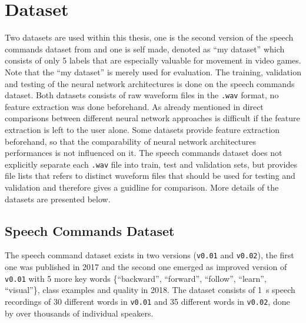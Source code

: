 
\section{Dataset}\label{sec:exp_dataset}
\thesisStateReady
Two datasets are used within this thesis, one is the second version of the speech commands dataset from \cite{Warden2018} and one is self made, denoted as \enquote{my dataset} which consists of only 5 labels that are especially valuable for movement in video games.
Note that the \enquote{my dataset} is merely used for evaluation.
The training, validation and testing of the neural network architectures is done on the speech commands dataset.
Both datasets consists of raw waveform files in the \texttt{.wav} format, no feature extraction was done beforehand.
As already mentioned in  direct comparisons between different neural network approaches is difficult if the feature extraction is left to the user alone.
Some datasets provide feature extraction beforehand, so that the comparability of neural network architectures performances is not influenced on it.
The speech commands dataset does not explicitly separate each \texttt{.wav} file into train, test and validation sets, but provides file lists that refers to distinct waveform files that should be used for testing and validation and therefore gives a guidline for comparison.
More details of the datasets are presented below.



% 



\subsection{Speech Commands Dataset}\label{sec:exp_dataset_speech_cmd}
The speech command dataset \cite{Warden2018} exists in two versions (\texttt{v0.01} and \texttt{v0.02}), the first one was published in 2017 and the second one emerged as improved version of \texttt{v0.01} with 5 more key words \{\enquote{backward}, \enquote{forward}, \enquote{follow}, \enquote{learn}, \enquote{visual}\}, class examples and quality in 2018.
The  dataset consists of \SI{1}{\second} speech recordings of 30 different words in \texttt{v0.01} and 35 different words in \texttt{v0.02}, done by over thousands of individual speakers.

